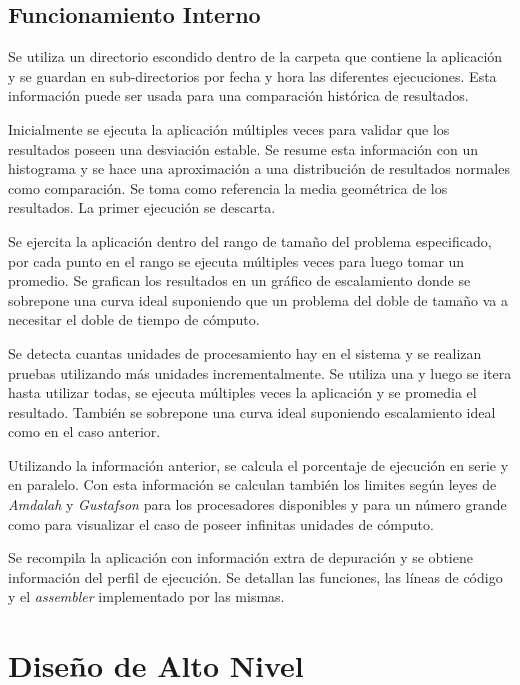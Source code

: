 \documentclass[a4paper]{report}
\begin{document}
\subsection{Funcionamiento Interno}

Se utiliza un directorio escondido dentro de la carpeta que contiene la aplicación y se guardan en sub-directorios por fecha y hora las diferentes ejecuciones. 
Esta información puede ser usada para una comparación histórica de resultados.

\bigskip

Inicialmente se ejecuta la aplicación múltiples veces para validar que los resultados poseen una desviación estable. Se resume esta información con un histograma y se hace una aproximación
a una distribución de resultados normales como comparación. Se toma como referencia la media geométrica de los resultados. La primer ejecución se descarta.

\bigskip

Se ejercita la aplicación dentro del rango de tamaño del problema especificado, por cada punto en el rango se ejecuta múltiples veces para luego tomar un promedio. Se grafican los resultados
en un gráfico de escalamiento donde se sobrepone una curva ideal suponiendo que un problema del doble de tamaño va a necesitar el doble de tiempo de cómputo.

\bigskip

Se detecta cuantas unidades de procesamiento hay en el sistema y se realizan pruebas utilizando más unidades incrementalmente. Se utiliza una y luego se itera hasta utilizar todas,
se ejecuta múltiples veces la aplicación y se promedia el resultado. También se sobrepone una curva ideal suponiendo escalamiento ideal como en el caso anterior.

\bigskip

Utilizando la información anterior, se calcula el porcentaje de ejecución en serie y en paralelo. Con esta información se calculan también los limites según leyes de {\it Amdalah} y
{\it Gustafson} para los procesadores disponibles y para un número grande como para visualizar el caso de poseer infinitas unidades de cómputo.

\bigskip

Se recompila la aplicación con información extra de depuración y se obtiene información del perfil de ejecución. Se detallan las funciones, las líneas de código y el
{\it assembler} implementado por las mismas.

\section{Diseño de Alto Nivel}
\end{document}
